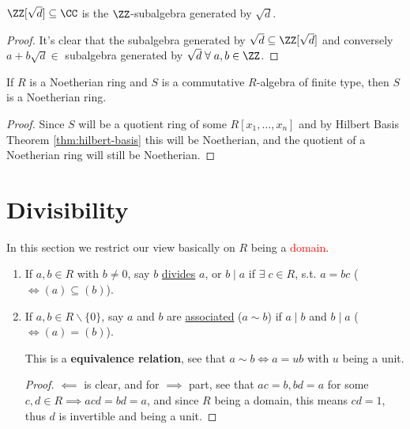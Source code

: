 \begin{eg}
	\( \ZZ[\sqrt d] \subseteq \CC \) is the \( \ZZ \)-subalgebra generated by \( \sqrt d \).
	\begin{proof}
		It's clear that the subalgebra generated by \( \sqrt d \subseteq \ZZ[\sqrt d] \) and conversely \( a+b\sqrt d \in  \) subalgebra generated by \( \sqrt d \; \forall \; a,b \in \ZZ\).
	\end{proof}
\end{eg}

\begin{remark}
	If \( R \) is a Noetherian ring and \( S \) is a commutative \( R \)-algebra of finite type, then \( S \) is a Noetherian ring.
	\begin{proof}
		Since \( S \) will be a quotient ring of some \( R[x_1,\ldots, x_n] \) and by Hilbert Basis Theorem \ref{thm:hilbert-basis} this will be Noetherian, and the quotient of a Noetherian ring will still be Noetherian.
	\end{proof}
\end{remark}

\section{Divisibility}

In this section we restrict our view basically on \( R \) being a \textcolor{red}{domain}.

\begin{definition}
	\leavevmode
	\begin{enumerate}
		\item If \( a,b \in R \) with \( b\ne 0 \), say \( b \) \underline{divides} \( a \), or \( b \mid a \) if \( \exists \; c\in R \), s.t. \( a=bc \) (\( \iff (a)\subseteq (b) \)).
		\item If \( a,b \in R \backslash\{0\} \), say \( a \) and \( b \) are \underline{associated} (\( a\sim b \)) if \( a\mid b \) and \( b\mid a \) (\( \iff (a) = (b) \)).
		      \begin{note}
			      This is a \textbf{equivalence relation}, see that \( a\sim b \iff a=ub\) with \( u \) being a unit.
			      \begin{proof}
				      \( \impliedby \) is clear, and for \( \implies \) part, see that \( ac=b, bd=a \) for some \( c,d\in R \implies acd = bd = a\), and since \( R \) being a domain, this means \( cd = 1 \), thus \( d \) is invertible and being a unit.
			      \end{proof}
		      \end{note}
	\end{enumerate}
\end{definition}

